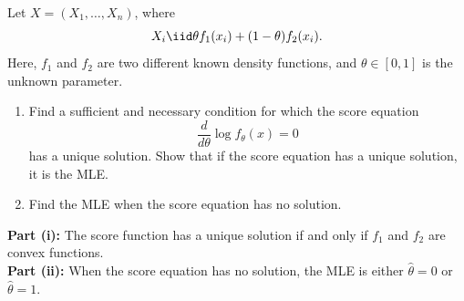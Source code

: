 \documentclass{article}
\begin{document}
\pagebreak

\begin{homeworkProblem}
  Let $X = (X_1, \ldots, X_n)$, where
  \[
    X_i \iid \theta f_1(x_i) + (1 - \theta) f_2(x_i).
  \]
  Here, $f_1$ and $f_2$ are two different known density functions, and $\theta \in [0,1]$ is the unknown parameter.
  \begin{enumerate}[label=(\roman*), topsep=5pt, itemsep=5pt]
    \item Find a sufficient and necessary condition for which the score equation
          \[
            \frac{d}{d\theta} \log f_\theta(x) = 0
          \]
          has a unique solution. Show that if the score equation has a unique solution, it is the MLE.
    \item Find the MLE when the score equation has no solution. \newline
  \end{enumerate}

  \solution

  \textbf{Part (i):}
  The score function has a unique solution if and only if $f_1$ and $f_2$ are convex functions. \\

  \textbf{Part (ii):} When the score equation has no solution, the MLE is either $\hat{\theta} = 0$ or $\hat{\theta} = 1$.


\end{homeworkProblem}

\pagebreak
\end{document}
